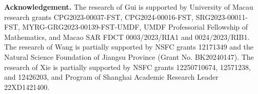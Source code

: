 \documentclass[12pt]{amsart}
\begin{document}
	{\bf Acknowledgement.}
	The research of Gui is supported by University of Macau research grants   CPG2023-00037-FST, CPG2024-00016-FST, SRG2023-00011-FST,  MYRG-GRG2023-00139-FST-UMDF,  UMDF Professorial Fellowship of Mathematics, and Macao SAR FDCT 0003/2023/RIA1 and 0024/2023/RIB1.  The research of Wang is partially supported by NSFC grants 12171349 and the Natural Science Foundation of Jiangsu Province (Grant No. BK20240147). The research of  Xie is partially supported by  NSFC grants 12250710674, 12571238, and 12426203,  and Program of Shanghai Academic Research Leader 22XD1421400. 
\end{document}

